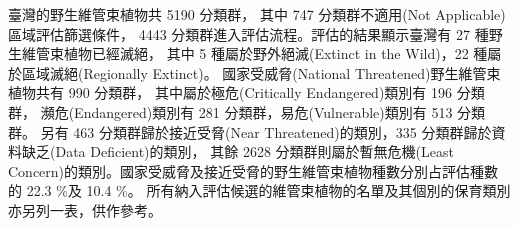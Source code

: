 \linespread{1.5}\selectfont
臺灣的野生維管束植物共 5190 分類群，
其中 747 分類群不適用(Not Applicable)區域評估篩選條件，
4443 分類群進入評估流程。評估的結果顯示臺灣有 27 種野生維管束植物已經滅絕，
其中 5 種屬於野外絕滅(Extinct in the Wild)，22 種屬於區域滅絕(Regionally Extinct)。
國家受威脅(National Threatened)野生維管束植物共有 990 分類群，
其中屬於極危(Critically Endangered)類別有 196 分類群，
瀕危(Endangered)類別有 281 分類群，易危(Vulnerable)類別有 513 分類群。
另有 463 分類群歸於接近受脅(Near Threatened)的類別，335 分類群歸於資料缺乏(Data Deficient)的類別，
其餘 2628 分類群則屬於暫無危機(Least Concern)的類別。國家受威脅及接近受脅的野生維管束植物種數分別占評估種數的 22.3 \%及 10.4 \%。
所有納入評估候選的維管束植物的名單及其個別的保育類別亦另列一表，供作參考。
